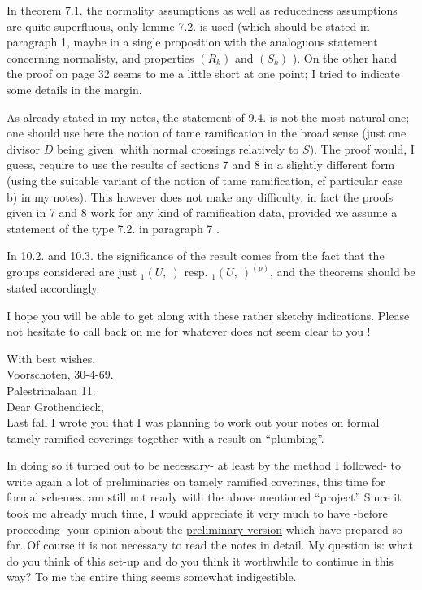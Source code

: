 In theorem 7.1. the normality assumptions as well as reducedness assumptions are quite superfluous, only lemme 7.2. is used (which should be stated in paragraph 1, maybe in a single proposition with the analoguous statement concerning normalisty, and properties $(R_k)$ and $(S_k)$ ). On the other hand the proof on page 32 seems to me  a little short at one point; I tried to indicate some details in the margin.

As already stated in my notes, the statement of 9.4. is not the most natural one; one should use here the notion of tame ramification in the broad sense (just one divisor $D$ being given, whith normal crossings relatively to $S$).  The proof would, I guess, require to use the results of sections 7 and 8 in a slightly different form (using the suitable variant of the notion of tame ramification, cf  particular case b) in my notes). This however does not make any difficulty, in fact the proofs given in 7 and 8 work for any kind of ramification data, provided we assume a statement of the type 7.2. in paragraph 7 .

In 10.2. and 10.3. the significance of the result comes from the fact that the groups considered are just ${}_1(U,\ )$ resp. ${}_1(U,\ )^{(p)}$, and the theorems should be stated accordingly.

I hope you will be able to get along with these rather sketchy indications. Please  not hesitate to call back on me for whatever does not seem clear to you !

With best wishes,\\
Voorschoten, 30-4-69.\\
Palestrinalaan 11.\\

Dear Grothendieck,\\

Last fall I wrote you that I was planning to work out your notes on formal tamely ramified coverings together with a result on ``plumbing''.

In doing so it turned out to be necessary- at least by the method I followed- to write again a lot of preliminaries on tamely ramified coverings, this time for formal schemes.  am still not ready with the above mentioned ``project''\handwritten{!} Since it took me already much time, I would appreciate it very much to have -before proceeding- your opinion about the \uline{preliminary version} which  have prepared so far. Of course it is not necessary to read the notes in detail. My question is: what do you think of this set-up and do you think it worthwhile to continue in this way? To me the entire thing seems somewhat indigestible.

